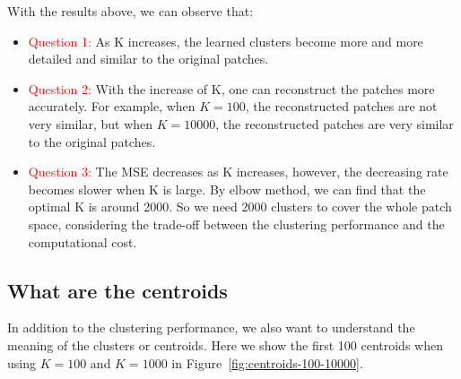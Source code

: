 \documentclass{article}
\begin{document}
With the results above, we can observe that:
\begin{itemize}
    \item \textcolor{red}{Question 1:} As K increases, the learned clusters become more and more detailed and similar to the original patches.
    \item \textcolor{red}{Question 2:} With the increase of K, one can reconstruct the patches more accurately. For example, when $K = 100$, the reconstructed patches are not very similar, but when $K = 10000$, the reconstructed patches are very similar to the original patches.
    \item \textcolor{red}{Question 3:} The MSE decreases as K increases, however, the decreasing rate becomes slower when K is large. By elbow method, we can find that the optimal K is around 2000. So we need 2000 clusters to cover the whole patch space, considering the trade-off between the clustering performance and the computational cost.
\end{itemize}


\subsection{What are the centroids}

In addition to the clustering performance, we also want to understand the meaning of the clusters or centroids. 
Here we show the first 100 centroids when using $K = 100$ and $K = 1000$ in Figure~\ref{fig:centroids-100-10000}.
\end{document}
